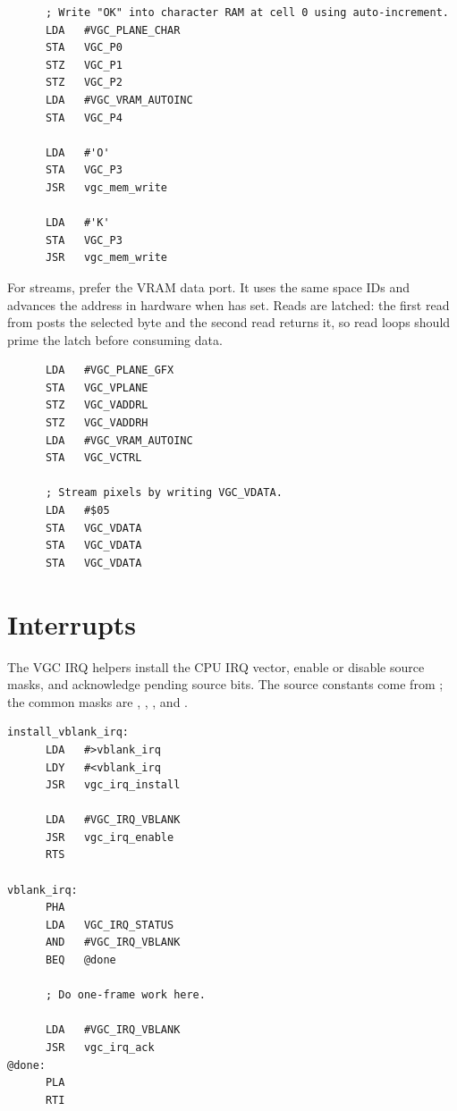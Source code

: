 \begin{lstlisting}
      ; Write "OK" into character RAM at cell 0 using auto-increment.
      LDA   #VGC_PLANE_CHAR
      STA   VGC_P0
      STZ   VGC_P1
      STZ   VGC_P2
      LDA   #VGC_VRAM_AUTOINC
      STA   VGC_P4

      LDA   #'O'
      STA   VGC_P3
      JSR   vgc_mem_write

      LDA   #'K'
      STA   VGC_P3
      JSR   vgc_mem_write
\end{lstlisting}

For streams, prefer the VRAM data port. It uses the same space IDs and advances
the address in hardware when  has
 set. Reads are latched: the first read from
 posts the selected byte and the second read returns it, so
read loops should prime the latch before consuming data.

\begin{lstlisting}
      LDA   #VGC_PLANE_GFX
      STA   VGC_VPLANE
      STZ   VGC_VADDRL
      STZ   VGC_VADDRH
      LDA   #VGC_VRAM_AUTOINC
      STA   VGC_VCTRL

      ; Stream pixels by writing VGC_VDATA.
      LDA   #$05
      STA   VGC_VDATA
      STA   VGC_VDATA
      STA   VGC_VDATA
\end{lstlisting}

\section{Interrupts}

The VGC IRQ helpers install the CPU IRQ vector, enable or disable source masks,
and acknowledge pending source bits. The source constants come from
; the common masks are ,
, , and
.

\begin{lstlisting}
install_vblank_irq:
      LDA   #>vblank_irq
      LDY   #<vblank_irq
      JSR   vgc_irq_install

      LDA   #VGC_IRQ_VBLANK
      JSR   vgc_irq_enable
      RTS

vblank_irq:
      PHA
      LDA   VGC_IRQ_STATUS
      AND   #VGC_IRQ_VBLANK
      BEQ   @done

      ; Do one-frame work here.

      LDA   #VGC_IRQ_VBLANK
      JSR   vgc_irq_ack
@done:
      PLA
      RTI
\end{lstlisting}

